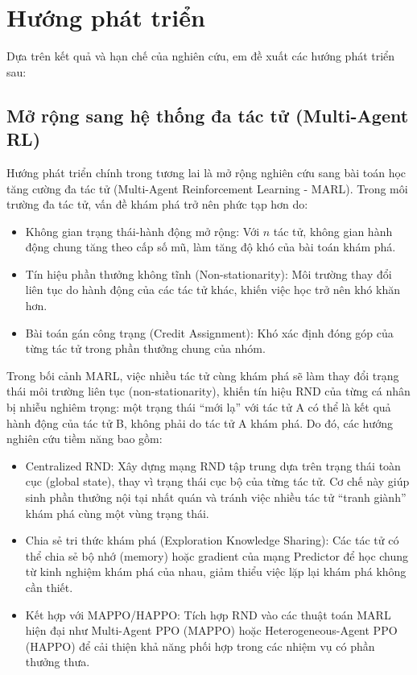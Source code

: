 \documentclass{uetgraduation}
\begin{document}
\section{Hướng phát triển}

Dựa trên kết quả và hạn chế của nghiên cứu, em đề xuất các hướng phát triển sau:

\subsection{Mở rộng sang hệ thống đa tác tử (Multi-Agent RL)}

Hướng phát triển chính trong tương lai là mở rộng nghiên cứu sang bài toán học tăng cường đa tác tử (Multi-Agent Reinforcement Learning - MARL). Trong môi trường đa tác tử, vấn đề khám phá trở nên phức tạp hơn do:
\begin{itemize}
    \item Không gian trạng thái-hành động mở rộng: Với $n$ tác tử, không gian hành động chung tăng theo cấp số mũ, làm tăng độ khó của bài toán khám phá.
    \item Tín hiệu phần thưởng không tĩnh (Non-stationarity): Môi trường thay đổi liên tục do hành động của các tác tử khác, khiến việc học trở nên khó khăn hơn.
    \item Bài toán gán công trạng (Credit Assignment): Khó xác định đóng góp của từng tác tử trong phần thưởng chung của nhóm.
\end{itemize}

Trong bối cảnh MARL, việc nhiều tác tử cùng khám phá sẽ làm thay đổi trạng thái môi trường liên tục (non-stationarity), khiến tín hiệu RND của từng cá nhân bị nhiễu nghiêm trọng: một trạng thái ``mới lạ'' với tác tử A có thể là kết quả hành động của tác tử B, không phải do tác tử A khám phá. Do đó, các hướng nghiên cứu tiềm năng bao gồm:

\begin{itemize}
    \item Centralized RND: Xây dựng mạng RND tập trung dựa trên trạng thái toàn cục (global state), thay vì trạng thái cục bộ của từng tác tử. Cơ chế này giúp sinh phần thưởng nội tại nhất quán và tránh việc nhiều tác tử ``tranh giành'' khám phá cùng một vùng trạng thái.
    \item Chia sẻ tri thức khám phá (Exploration Knowledge Sharing): Các tác tử có thể chia sẻ bộ nhớ (memory) hoặc gradient của mạng Predictor để học chung từ kinh nghiệm khám phá của nhau, giảm thiểu việc lặp lại khám phá không cần thiết.
    \item Kết hợp với MAPPO/HAPPO: Tích hợp RND vào các thuật toán MARL hiện đại như Multi-Agent PPO (MAPPO) hoặc Heterogeneous-Agent PPO (HAPPO) để cải thiện khả năng phối hợp trong các nhiệm vụ có phần thưởng thưa.
\end{itemize}
\end{document}
